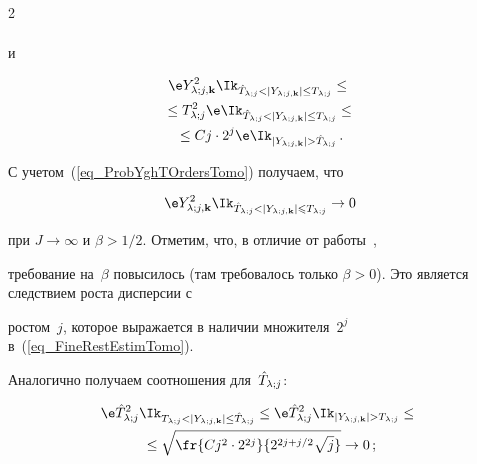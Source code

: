 \begin{multicols}{2}
\begin{multline*}
\end{multline*}










\noindent


и







\noindent


\begin{multline}


\e \Yljk^2 \Ik_{\hTlj<|\Yljk|\leq\Tlj} \leq {}\\


{}\leq \Tlj^2 \e \Ik_{\hTlj<|\Yljk|\leq 


 \Tlj} \leq{}\\


{}\leq C j\cdot 2^{j}


\e \indYjkghTj\,.


\label{eq_FineRestEstimTomo}


\end{multline}


С учетом~(\ref{eq_ProbYghTOrdersTomo}) получаем, что


\begin{equation*}


\e \Yljk^2 \Ik_{\hTlj<|\Yljk|\leqslant\Tlj} \rightarrow 0


\end{equation*}


при $J\rightarrow\infty$ и $\beta>1/2$. Отметим, что, в отличие от работы~\cite{MarkinLimitDistr}, 


требование на~$\beta$ повысилось (там требовалось только $\beta>0$). Это является следствием роста дисперсии с 


ростом~$j$, которое выражается в наличии множителя~$2^j$ в~(\ref{eq_FineRestEstimTomo}). 


Аналогично получаем соотношения для~$\hat T_{\lambda;j}$:


\begin{multline*}


\e \hTlj^2 \Ik_{\Tlj<|\Yljk|\leq\hTlj} \leq \e \hTlj^2 \indYjkgTj \leq{}\\


{}\leq \sqrt{ \fr{ C j^2 \cdot 2^{2j} }{ 2^{2j+j/2}\sqrt{j} } } \rightarrow 0\,;



\end{multline*}
\end{multicols}
